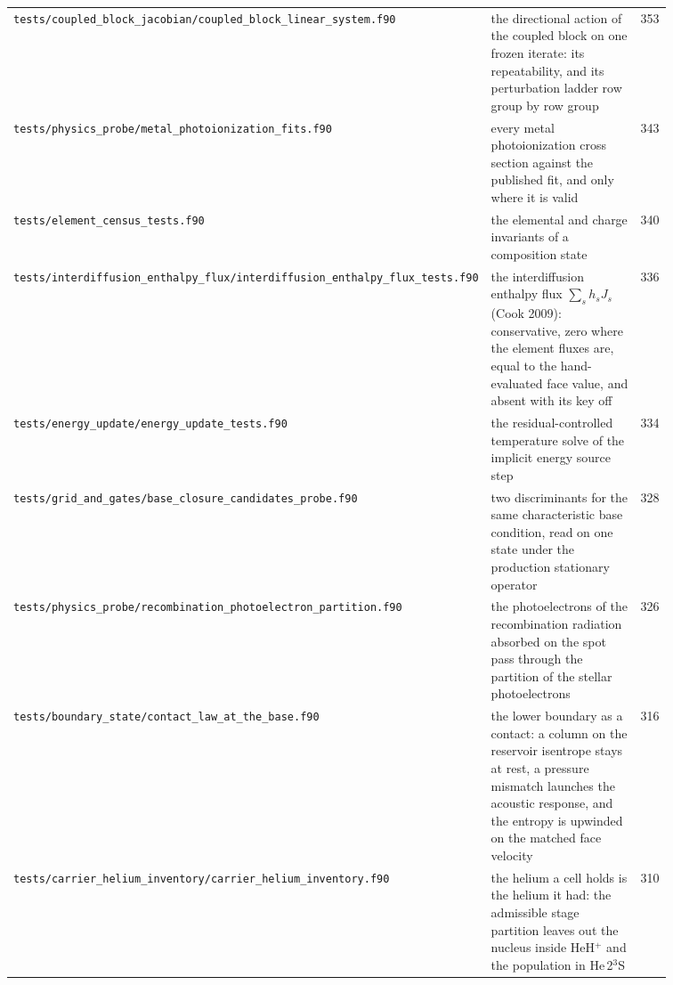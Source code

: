 {\begin{longtable}{@{}>{\raggedright\arraybackslash}p{0.36\linewidth} >{\raggedright\arraybackslash}p{0.50\linewidth} r@{}}
\texttt{tests/\allowbreak coupled\_\allowbreak block\_\allowbreak jacobian/\allowbreak coupled\_\allowbreak block\_\allowbreak linear\_\allowbreak system.f90} & the directional action of the coupled block on one frozen iterate: its repeatability, and its perturbation ladder row group by row group & 353 \\
\texttt{tests/\allowbreak physics\_\allowbreak probe/\allowbreak metal\_\allowbreak photoionization\_\allowbreak fits.f90} & every metal photoionization cross section against the published fit, and only where it is valid & 343 \\
\texttt{tests/\allowbreak element\_\allowbreak census\_\allowbreak tests.f90} & the elemental and charge invariants of a composition state & 340 \\
\texttt{tests/\allowbreak interdiffusion\_\allowbreak enthalpy\_\allowbreak flux/\allowbreak interdiffusion\_\allowbreak enthalpy\_\allowbreak flux\_\allowbreak tests.f90} & the interdiffusion enthalpy flux $\sum_s h_s J_s$ (Cook 2009): conservative, zero where the element fluxes are, equal to the hand-evaluated face value, and absent with its key off & 336 \\
\texttt{tests/\allowbreak energy\_\allowbreak update/\allowbreak energy\_\allowbreak update\_\allowbreak tests.f90} & the residual-controlled temperature solve of the implicit energy source step & 334 \\
\texttt{tests/\allowbreak grid\_\allowbreak and\_\allowbreak gates/\allowbreak base\_\allowbreak closure\_\allowbreak candidates\_\allowbreak probe.f90} & two discriminants for the same characteristic base condition, read on one state under the production stationary operator & 328 \\
\texttt{tests/\allowbreak physics\_\allowbreak probe/\allowbreak recombination\_\allowbreak photoelectron\_\allowbreak partition.f90} & the photoelectrons of the recombination radiation absorbed on the spot pass through the partition of the stellar photoelectrons & 326 \\
\texttt{tests/\allowbreak boundary\_\allowbreak state/\allowbreak contact\_\allowbreak law\_\allowbreak at\_\allowbreak the\_\allowbreak base.f90} & the lower boundary as a contact: a column on the reservoir isentrope stays at rest, a pressure mismatch launches the acoustic response, and the entropy is upwinded on the matched face velocity & 316 \\
\texttt{tests/\allowbreak carrier\_\allowbreak helium\_\allowbreak inventory/\allowbreak carrier\_\allowbreak helium\_\allowbreak inventory.f90} & the helium a cell holds is the helium it had: the admissible stage partition leaves out the nucleus inside HeH$^+$ and the population in He\,2$^3$S & 310 \\

\end{longtable}}
